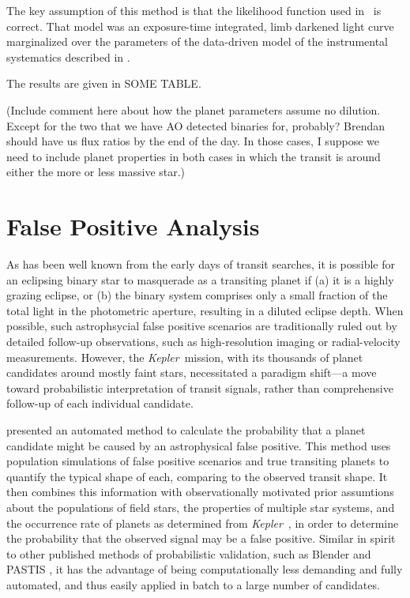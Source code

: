 \documentclass{emulateapj}
\newcommand{\project}[1]{\textsl{#1}}
\newcommand{\kep}{\project{Kepler}}
\newcommand{\paperit}{\citet{Foreman-Mackey15}}
\begin{document}
The key assumption of this method is that the likelihood function used in
\paperit\ is correct.
That model was an exposure-time integrated, limb darkened light curve
\citep{Mandel02,Kipping10b} marginalized over the parameters of the
data-driven model of the instrumental systematics described in \paperit.

The results are given in SOME TABLE.


(Include comment here about how the planet parameters assume no dilution.
Except for the two that we have AO detected binaries for, probably?
Brendan should have us flux ratios by the end of the day.
In those cases, I suppose we need to include planet properties in both cases
in which the transit is around either the more or less massive star.)

\section{False Positive Analysis}
As has been well known from the early days of transit searches, it is
possible for an eclipsing binary star to masquerade as a transiting
planet if (a) it is a highly grazing eclipse, or (b) the binary system
comprises only a small fraction of the total light in the photometric
aperture, resulting in a diluted eclipse depth.
When possible, such astrophsycial false positive scenarios are traditionally
ruled out by detailed follow-up observations, such as high-resolution
imaging or radial-velocity measurements.
However, the \kep\ mission, with its thousands of planet candidates
around mostly faint stars, necessitated a paradigm shift---a move
toward probabilistic interpretation of transit signals, rather than
comprehensive follow-up of each individual candidate.

\citet{Morton12} presented an automated method to calculate the
probability that a planet candidate might be caused by an
astrophysical false positive.
This method uses population simulations
of false positive scenarios and true transiting planets to quantify
the typical shape of each, comparing to the observed transit shape.
It then combines this information with observationally motivated prior
assumtions about the populations of field stars, the properties of
multiple star systems, and the occurrence rate of planets as determined
from \kep\ \citet{Fressin13}, in order to determine the probability that
the observed signal may be a false positive.
Similar in spirit to other published methods of
probabilistic validation, such as Blender \citep{} and PASTIS
\citep{}, it has the advantage of being computationally less demanding
and fully automated, and thus easily applied in batch to a large
number of candidates.
\end{document}
